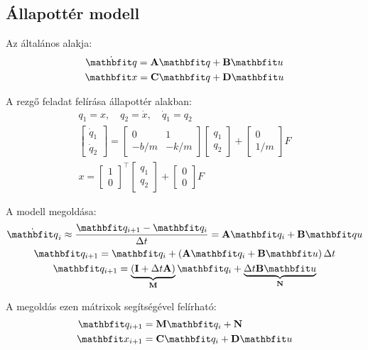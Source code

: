 \documentclass[../../main.tex]{subfiles}
\begin{document}
\subsection{Állapottér modell}

Az  általános alakja:
\begin{gather*}
  \dot{\rvec q} = \rmat A \rvec q + \rmat B \rvec u \\
  \rvec x = \rmat C \rvec q + \rmat D \rvec u
\end{gather*}

A rezgő feladat felírása állapottér alakban:
\begin{gather*}
  q_1 = x, \quad q_2 = \dot x, \quad \dot q_1 = q_2 \\
  \begin{bmatrix}
    \dot q_1 \\ \dot q_2
  \end{bmatrix} = \begin{bmatrix}
    0 & 1 \\ -b/m & -k/m
  \end{bmatrix} \begin{bmatrix}
    q_1 \\ q_2
  \end{bmatrix} + \begin{bmatrix}
    0 \\ 1/m
  \end{bmatrix} F \\
  x = \begin{bmatrix}
    1 \\ 0
  \end{bmatrix}^\intercal \begin{bmatrix}
    q_1 \\ q_2
  \end{bmatrix} + \begin{bmatrix}
    0 \\ 0
  \end{bmatrix} F
\end{gather*}

A modell megoldása:
\begin{gather*}
  \dot{\rvec{q}}_i \approx \frac{\rvec q_{i+1} - \rvec q_i}{\Delta t}
  = \rmat A \rvec q_i + \rmat B \rvec qu
  \\
  \rvec q_{i+1} = \rvec q_i + \left( \rmat A \rvec q_i + \rmat B \rvec u \right) \Delta t
  \\
  \rvec q_{i+1}
  = \underbrace{\left(\rmat I + \Delta t \rmat A\right)}_{\rmat M} \rvec q_i
  + \underbrace{\Delta t \rmat B \rvec u}_{\rmat N}
\end{gather*}

A megoldás ezen mátrixok segítségével felírható:
\begin{align*}
  \rvec q_{i+1} & = \rmat M \rvec q_i + \rmat N         \\
  \rvec x_{i+1} & = \rmat C \rvec q_i + \rmat D \rvec u
\end{align*}
\end{document}
